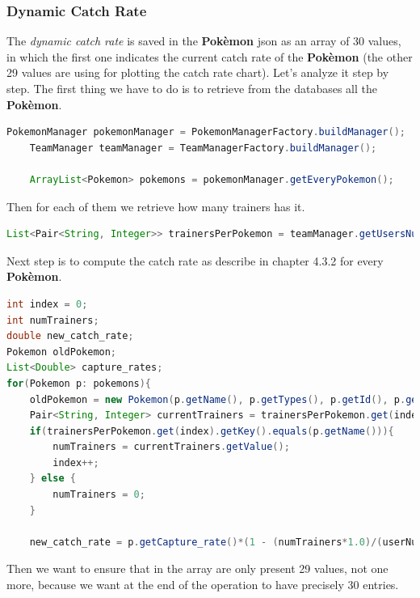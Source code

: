 \subsubsection{Dynamic Catch Rate}
The \textit{dynamic catch rate} is saved in the \textbf{Pokèmon} json as an array of 30 values, in which the first one indicates the current catch rate of the \textbf{Pokèmon} (the other 29 values are using for plotting the catch rate chart). Let’s analyze it step by step.
The first thing we have to do is to retrieve from the databases all the \textbf{Pokèmon}.


\begin{lstlisting}[language=Java]
	PokemonManager pokemonManager = PokemonManagerFactory.buildManager();
	TeamManager teamManager = TeamManagerFactory.buildManager();
	
	ArrayList<Pokemon> pokemons = pokemonManager.getEveryPokemon();
\end{lstlisting}

Then for each of them we retrieve how many trainers has it.

\begin{lstlisting}[language=Java]
	List<Pair<String, Integer>> trainersPerPokemon = teamManager.getUsersNumberThatOwnsAPokemonNotFiltered();
\end{lstlisting}
Next step is to compute the catch rate as describe in chapter 4.3.2 for every \textbf{Pokèmon}.

\begin{lstlisting}[language=Java]
int index = 0;
int numTrainers;
double new_catch_rate;
Pokemon oldPokemon;
List<Double> capture_rates;
for(Pokemon p: pokemons){
	oldPokemon = new Pokemon(p.getName(), p.getTypes(), p.getId(), p.getCapture_rate(), p.getCapture_rates(), (int)p.getHeight(), (int)p.getWeight(), p.getBiology(), p.getPortrait(), p.getSprite());
	Pair<String, Integer> currentTrainers = trainersPerPokemon.get(index);
	if(trainersPerPokemon.get(index).getKey().equals(p.getName())){
		numTrainers = currentTrainers.getValue();
		index++;
	} else {
		numTrainers = 0;
	}
	
	new_catch_rate = p.getCapture_rate()*(1 - (numTrainers*1.0)/(userNumber));

\end{lstlisting}

Then we want to ensure that in the array are only present 29 values, not one more, because we want at the end of the operation to have precisely 30 entries.

